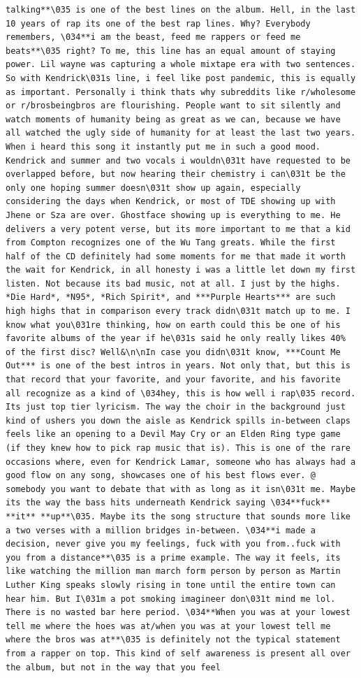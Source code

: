 \documentclass[
  letterpaper,
  DIV=11,
  numbers=noendperiod]{scrreprt}
\begin{document}
\begin{verbatim}
talking**\035 is one of the best lines on the album. Hell, in the last 10 years of rap its one of the best rap lines. Why? Everybody remembers, \034**i am the beast, feed me rappers or feed me beats**\035 right? To me, this line has an equal amount of staying power. Lil wayne was capturing a whole mixtape era with two sentences. So with Kendrick\031s line, i feel like post pandemic, this is equally as important. Personally i think thats why subreddits like r/wholesome or r/brosbeingbros are flourishing. People want to sit silently and watch moments of humanity being as great as we can, because we have all watched the ugly side of humanity for at least the last two years. When i heard this song it instantly put me in such a good mood. Kendrick and summer and two vocals i wouldn\031t have requested to be overlapped before, but now hearing their chemistry i can\031t be the only one hoping summer doesn\031t show up again, especially considering the days when Kendrick, or most of TDE showing up with Jhene or Sza are over. Ghostface showing up is everything to me. He delivers a very potent verse, but its more important to me that a kid from Compton recognizes one of the Wu Tang greats. While the first half of the CD definitely had some moments for me that made it worth the wait for Kendrick, in all honesty i was a little let down my first listen. Not because its bad music, not at all. I just by the highs. *Die Hard*, *N95*, *Rich Spirit*, and ***Purple Hearts*** are such high highs that in comparison every track didn\031t match up to me. I know what you\031re thinking, how on earth could this be one of his favorite albums of the year if he\031s said he only really likes 40% of the first disc? Well&\n\nIn case you didn\031t know, ***Count Me Out*** is one of the best intros in years. Not only that, but this is that record that your favorite, and your favorite, and his favorite all recognize as a kind of \034hey, this is how well i rap\035 record. Its just top tier lyricism. The way the choir in the background just kind of ushers you down the aisle as Kendrick spills in-between claps feels like an opening to a Devil May Cry or an Elden Ring type game (if they knew how to pick rap music that is). This is one of the rare occasions where, even for Kendrick Lamar, someone who has always had a good flow on any song, showcases one of his best flows ever. @ somebody you want to debate that with as long as it isn\031t me. Maybe its the way the bass hits underneath Kendrick saying \034**fuck** **it** **up**\035. Maybe its the song structure that sounds more like a two verses with a million bridges in-between. \034**i made a decision, never give you my feelings, fuck with you from..fuck with you from a distance**\035 is a prime example. The way it feels, its like watching the million man march form person by person as Martin Luther King speaks slowly rising in tone until the entire town can hear him. But I\031m a pot smoking imagineer don\031t mind me lol. There is no wasted bar here period. \034**When you was at your lowest tell me where the hoes was at/when you was at your lowest tell me where the bros was at**\035 is definitely not the typical statement from a rapper on top. This kind of self awareness is present all over the album, but not in the way that you feel 
\end{verbatim}
\end{document}
